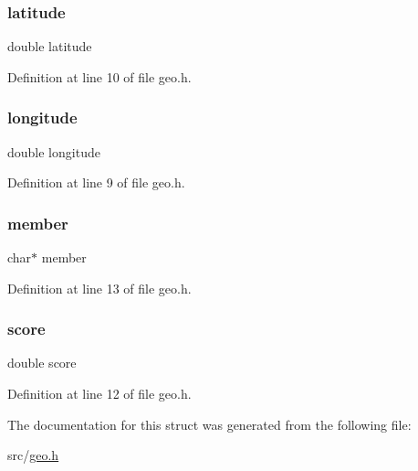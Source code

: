 \subsubsection{\texorpdfstring{latitude}{latitude}}
{\footnotesize\ttfamily double latitude}



Definition at line 10 of file geo.\+h.

\mbox{\label{structgeo_point_ac155e35fdeebafc89723a51520fb9fe6}} 
\subsubsection{\texorpdfstring{longitude}{longitude}}
{\footnotesize\ttfamily double longitude}



Definition at line 9 of file geo.\+h.

\mbox{\label{structgeo_point_a2dc40cdaee6928fd3dba8fde8f4eed21}} 
\subsubsection{\texorpdfstring{member}{member}}
{\footnotesize\ttfamily char$\ast$ member}



Definition at line 13 of file geo.\+h.

\mbox{\label{structgeo_point_a40a24ec85daa9ac70aa74e4ca744f838}} 
\subsubsection{\texorpdfstring{score}{score}}
{\footnotesize\ttfamily double score}



Definition at line 12 of file geo.\+h.



The documentation for this struct was generated from the following file\+:\begin{DoxyCompactItemize}
\item 
src/\hyperlink{geo_8h}{geo.\+h}\end{DoxyCompactItemize}
